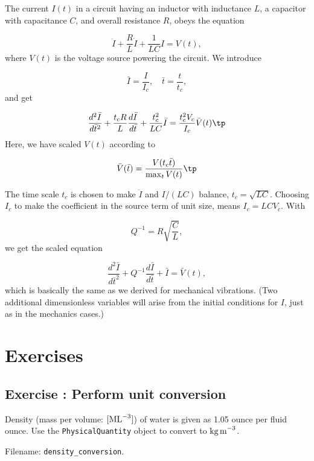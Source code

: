 \documentclass[graybox,envcountchap,sectrefs,final]{svmonodo}
\newcounter{doconce:movie:counter}
\newenvironment{doconceexercise}{}{}
\newcounter{doconceexercisecounter}
\begin{document}
The current $I(t)$ in a
circuit having an inductor with inductance $L$, a capacitor with
capacitance $C$, and overall resistance $R$, obeys the equation

\begin{equation}
\ddot I + \frac{R}{L}\dot I + \frac{1}{LC}I =  V(t),
\end{equation}
where $V(t)$ is the voltage source powering the circuit.
We introduce

\[ \bar I=\frac{I}{I_c},\quad \bar t = \frac{t}{t_c},\]
and get

\[ \frac{d^2\bar I}{d\bar t^2} + \frac{t_c R}{L}\frac{d\bar I}{d\bar t}
+ \frac{t_c^2}{LC}\bar I = \frac{t_c^2V_c}{I_c} \bar V(t)\tp\]
Here, we have scaled $V(t)$ according to

\[ \bar V(\bar t) = \frac{V(t_c\bar t)}{\max_t V(t)}\tp\]

The time scale $t_c$ is chosen to make $\ddot I$ and $I/(LC)$ balance,
$t_c = \sqrt{LC}$.
Choosing $I_c$ to make the coefficient in the source term of unit size,
means $I_c = LCV_c$.
With

\[ Q^{-1} = R\sqrt{\frac{C}{L}},\]
we get the scaled equation

\begin{equation}
\frac{d^2\bar I}{d\bar t^2} + Q^{-1}\frac{d\bar I}{d\bar t}
+ \bar I = \bar V(t),
\end{equation}
which is basically the same as we derived for mechanical vibrations.
(Two additional dimensionless variables will arise from the initial
conditions for $I$, just as in the mechanics cases.)

\section{Exercises}



\begin{doconceexercise}

\subsection*{Exercise \thedoconceexercisecounter: Perform unit conversion}

\label{sec:scale:exer:US2SI1}

Density (mass per volume: $[\hbox{ML}^{-3}]$) of water is
given as 1.05 ounce per fluid ounce. Use the \texttt{PhysicalQuantity} object
to convert to $\hbox{kg\,m}^{-3}$.


\noindent Filename: \Verb!density_conversion!.

\end{doconceexercise}
\end{document}
